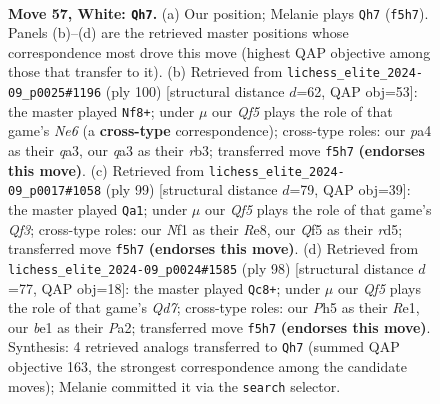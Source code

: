 \documentclass[11pt]{article}
\begin{document}
\clearpage

\begin{figure}[p]\centering
\begin{subfigure}{0.46\textwidth}\centering
\resizebox{\linewidth}{!}{%
\newchessgame
\chessboard[
  setfen={r5r1/p5p1/2k4p/3p1Q1P/p2P2P1/q3P3/7K/4bN2 w - - 22 57},
  showmover=false,
  pgfstyle=straightmove, color=movearrow, markmove={f5-h7}
]}
\caption{}
\end{subfigure}\hfill
\begin{subfigure}{0.46\textwidth}\centering
\resizebox{\linewidth}{!}{%
\newchessgame
\chessboard[
  setfen={4Q3/2p3pk/1pp1N2p/8/3P1PP1/qr5P/7K/8 w - - 9 51},
  showmover=false,
  pgfstyle=straightmove, color=movearrow, markmove={e6-f8}
]}
\caption{}
\end{subfigure}
\\[4pt]
\begin{subfigure}{0.46\textwidth}\centering
\resizebox{\linewidth}{!}{%
\newchessgame
\chessboard[
  setfen={4r3/p5pk/5q1p/2PR1p2/1P2p2P/6P1/3Q1P1K/8 b - - 0 50},
  showmover=false,
  pgfstyle=straightmove, color=movearrow, markmove={f6-a1}
]}
\caption{}
\end{subfigure}\hfill
\begin{subfigure}{0.46\textwidth}\centering
\resizebox{\linewidth}{!}{%
\newchessgame
\chessboard[
  setfen={6k1/p2Q4/1p1pP2q/8/4Pppr/8/PP3PK1/4R3 w - - 21 50},
  showmover=false,
  pgfstyle=straightmove, color=movearrow, markmove={d7-c8}
]}
\caption{}
\end{subfigure}
\caption{\textbf{Move 57, White: \texttt{Qh7}.} (a) Our position; Melanie plays \texttt{Qh7} (\texttt{f5h7}). Panels (b)--(d) are the retrieved master positions whose correspondence most drove this move (highest QAP objective among those that transfer to it). (b) Retrieved from \texttt{lichess\_elite\_2024-09\_p0025\#1196} (ply 100) [structural distance $d$=62, QAP obj=53]: the master played \texttt{Nf8+}; under $\mu$ our \emph{Qf5} plays the role of that game's \emph{Ne6} (a \textbf{cross-type} correspondence); cross-type roles: our \emph{p}a4 as their \emph{q}a3, our \emph{q}a3 as their \emph{r}b3; transferred move \texttt{f5h7} \textbf{(endorses this move)}. (c) Retrieved from \texttt{lichess\_elite\_2024-09\_p0017\#1058} (ply 99) [structural distance $d$=79, QAP obj=39]: the master played \texttt{Qa1}; under $\mu$ our \emph{Qf5} plays the role of that game's \emph{Qf3}; cross-type roles: our \emph{N}f1 as their \emph{R}e8, our \emph{Q}f5 as their \emph{r}d5; transferred move \texttt{f5h7} \textbf{(endorses this move)}. (d) Retrieved from \texttt{lichess\_elite\_2024-09\_p0024\#1585} (ply 98) [structural distance $d$=77, QAP obj=18]: the master played \texttt{Qc8+}; under $\mu$ our \emph{Qf5} plays the role of that game's \emph{Qd7}; cross-type roles: our \emph{P}h5 as their \emph{R}e1, our \emph{b}e1 as their \emph{P}a2; transferred move \texttt{f5h7} \textbf{(endorses this move)}. Synthesis: 4 retrieved analogs transferred to \texttt{Qh7} (summed QAP objective 163, the strongest correspondence among the candidate moves); Melanie committed it via the \texttt{search} selector.}
\label{fig:thought-m112}
\end{figure}
\end{document}
